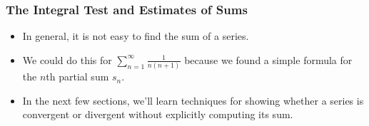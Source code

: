 \begin{frame}\frametitle{The Integral Test and Estimates of Sums}
\begin{itemize}
\item  In general, it is not easy to find the sum of a series.
\item  We could do this for $\displaystyle \sum_{n=1}^\infty \frac{1}{n(n+1)}$ because we found a simple formula for the $n$th partial sum $s_n$.
\item  In the next few sections, we'll learn techniques for showing whether a series is convergent or divergent without explicitly computing its sum.
\end{itemize}
\end{frame}

